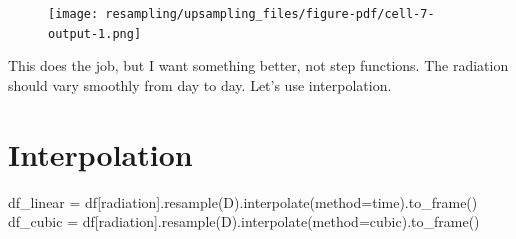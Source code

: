 \documentclass[
  letterpaper,
  DIV=11,
  numbers=noendperiod,
  oneside]{scrreprt}
\newenvironment{Shaded}{\begin{snugshade}}{\end{snugshade}}
\newcommand{\NormalTok}[1]{\textcolor[rgb]{0.00,0.23,0.31}{#1}}
\newcommand{\OperatorTok}[1]{\textcolor[rgb]{0.37,0.37,0.37}{#1}}
\newcommand{\StringTok}[1]{\textcolor[rgb]{0.13,0.47,0.30}{#1}}
\begin{document}
\begin{figure}[H]

{\centering \texttt{[image: resampling/upsampling\_files/figure-pdf/cell-7-output-1.png]}

}

\end{figure}

This does the job, but I want something better, not step functions. The
radiation should vary smoothly from day to day. Let's use interpolation.

\hypertarget{interpolation}{%
\section{Interpolation}\label{interpolation}}

\begin{Shaded}
\begin{Highlighting}[]
\NormalTok{df\_linear }\OperatorTok{=}\NormalTok{ df[}\StringTok{\textquotesingle{}radiation\textquotesingle{}}\NormalTok{].resample(}\StringTok{\textquotesingle{}D\textquotesingle{}}\NormalTok{).interpolate(method}\OperatorTok{=}\StringTok{\textquotesingle{}time\textquotesingle{}}\NormalTok{).to\_frame()}
\NormalTok{df\_cubic }\OperatorTok{=}\NormalTok{ df[}\StringTok{\textquotesingle{}radiation\textquotesingle{}}\NormalTok{].resample(}\StringTok{\textquotesingle{}D\textquotesingle{}}\NormalTok{).interpolate(method}\OperatorTok{=}\StringTok{\textquotesingle{}cubic\textquotesingle{}}\NormalTok{).to\_frame()}
\end{Highlighting}
\end{Shaded}
\end{document}

